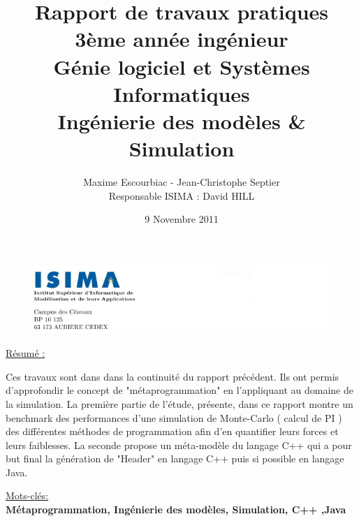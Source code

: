 \documentclass[a4paper,11pt]{report}
\begin{document}
\begin{figure}
   \includegraphics[scale = 0.75]{HeaderPagedeGarde.PNG}
\end{figure}


\author{Maxime Escourbiac - Jean-Christophe Septier \\ Responsable ISIMA : David HILL}
\title{
   Rapport de travaux pratiques \\ 3ème année ingénieur \\ Génie logiciel et Systèmes Informatiques \\
  \bigskip
   \large{
      Ingénierie des modèles \& Simulation
   }
}
\date{9 Novembre 2011}
\maketitle

\newpage


\begin{flushleft}
\LARGE{ \underline {Résumé :}\bigskip}
\end{flushleft}

\normalsize{
Ces travaux sont dans dans la continuité du rapport précédent. Ils ont permis d'approfondir le concept de "métaprogrammation" en l'appliquant au domaine de la simulation. La première partie de l'étude, présente, dans ce rapport montre un benchmark des performances d'une simulation de Monte-Carlo ( calcul de PI ) des différentes méthodes de programmation afin d'en quantifier leurs forces et leurs faiblesses. La seconde propose un méta-modèle du langage C++ qui a pour but final la génération de "Header" en langage C++ puis si possible en langage Java.
}

\begin{flushleft}
\large{ \underline {Mots-clés:}\bigskip}\\
{\bf   Métaprogrammation, Ingénierie des modèles, Simulation, C++ ,Java}
\end{flushleft}

\newpage

\end{document}
